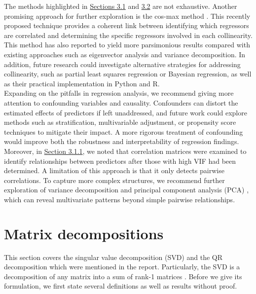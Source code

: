 \documentclass[12pt]{article}
\begin{document}
	The methods highlighted in \hyperref[sec:3.1]{Sections 3.1} and \hyperref[sec:3.2]{3.2} are not exhaustive. Another promising approach for further exploration is the cos-max method \cite{Shabuz2024}. This recently proposed technique provides a coherent link between identifying which regressors are correlated and determining the specific regressors involved in each collinearity. This method has also reported to yield more parsimonious results compared with existing approaches such as eigenvector analysis and variance decomposition. In addition, future research could investigate alternative strategies for addressing collinearity, such as partial least squares regression or Bayesian regression, as well as their practical implementation in Python and R.\\
	
	Expanding on the pitfalls in regression analysis, we recommend giving more attention to confounding variables and causality. Confounders can distort the estimated effects of predictors if left unaddressed, and future work could explore methods such as stratification, multivariable adjustment, or propensity score techniques to mitigate their impact. A more rigorous treatment of confounding would improve both the robustness and interpretability of regression findings.\\
	
	Moreover, in \hyperref[sec:311]{Section 3.1.1}, we noted that correlation matrices were examined to identify relationships between predictors after those with high VIF had been determined. A limitation of this approach is that it only detects pairwise correlations. To capture more complex structures, we recommend further exploration of variance decomposition and principal component analysis (PCA) \cite{Johnston2018}, which can reveal multivariate patterns beyond simple pairwise relationships.
	
	\pagebreak
	
	\appendix %
	\section{\label{sec:svd}Matrix decompositions}
	This section covers the singular value decomposition (SVD) and the QR decomposition which were mentioned in the report. Particularly, the SVD is a decomposition of any matrix into a sum of rank-1 matrices \cite{Strang2019}. Before we give its formulation, we first state several definitions as well as results without proof.
\end{document}
